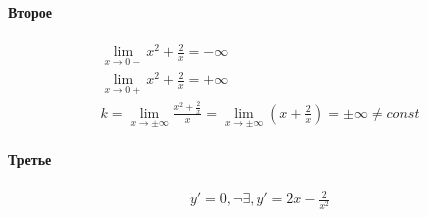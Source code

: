 \documentclass{article}
\begin{document}
\paragraph{Второе}
\begin{gather*}
    \lim_{x \to 0-} x^2 + \frac{2}{x} = -\infty \\
    \lim_{x \to 0+} x^2 + \frac{2}{x} = +\infty \\
    k = \lim_{x \to \pm \infty} \frac{x^2 + \frac{2}{x}}{x} =
    \lim_{x \to \pm \infty} \left( x + \frac{2}{x} \right) = \pm \infty \neq const
\end{gather*}
\paragraph{Третье}
\begin{gather*}
    y' = 0, \neg \exists, y' = 2x - \frac{2}{x^2}
\end{gather*}
\end{document}

